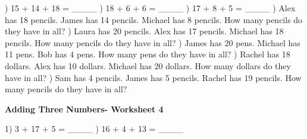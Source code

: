 \documentclass{article}%
\begin{document}
\newline%
\newline%
) 15 + 14 + 18 = \_\_\_\_%
\newline%
\newline%
) 18 + 6 + 6 = \_\_\_\_%
\newline%
\newline%
) 17 + 8 + 5 = \_\_\_\_%
\newline%
\newline%
) Alex has 18 pencils. James has 14 pencils. Michael has 8 pencils. How many pencils do they have in all?%
\newline%
\newline%
) Laura has 20 pencils. Alex has 17 pencils. Michael has 18 pencils. How many pencils do they have in all?%
\newline%
\newline%
) James has 20 pens. Michael has 11 pens. Bob has 4 pens. How many pens do they have in all?%
\newline%
\newline%
) Rachel has 18 dollars. Alex has 10 dollars. Michael has 20 dollars. How many dollars do they have in all?%
\newline%
\newline%
) Sam has 4 pencils. James has 5 pencils. Rachel has 19 pencils. How many pencils do they have in all?%
\newline%
\newline%
\newline%
\pagebreak%
\large%
\begin{center}%
\textbf{Adding Three Numbers- Worksheet 4}%
\newline%
\newline%
\newline%
\end{center} \normalsize%
1) 3 + 17 + 5 = \_\_\_\_%
\newline%
\newline%
) 16 + 4 + 13 = \_\_\_\_%
\newline%
\newline%
\end{document}
